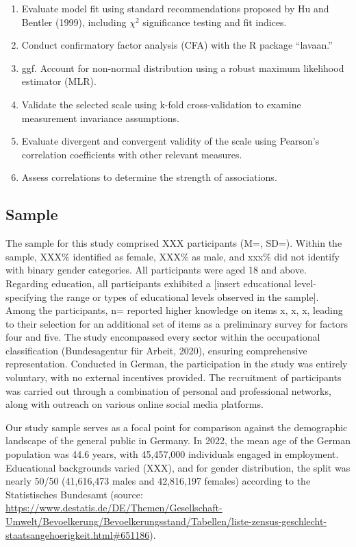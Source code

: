 \documentclass[
  12pt,
  a4paper,
  twoside]{article}
\providecommand{\tightlist}{%
  \setlength{\itemsep}{0pt}\setlength{\parskip}{0pt}}
\begin{document}
\begin{enumerate}
\def\labelenumi{\arabic{enumi}.}
\tightlist
\item
  Evaluate model fit using standard recommendations proposed by Hu and Bentler (1999), including \(\chi^2\) significance testing and fit indices.
\item
  Conduct confirmatory factor analysis (CFA) with the R package ``lavaan.''
\item
  ggf. Account for non-normal distribution using a robust maximum likelihood estimator (MLR).
\item
  Validate the selected scale using k-fold cross-validation to examine measurement invariance assumptions.
\item
  Evaluate divergent and convergent validity of the scale using Pearson's correlation coefficients with other relevant measures.
\item
  Assess correlations to determine the strength of associations.
\end{enumerate}

\hypertarget{sample}{%
\subsection{Sample}\label{sample}}

The sample for this study comprised XXX participants (M=, SD=). Within the sample, XXX\% identified as female, XXX\% as male, and xxx\% did not identify with binary gender categories. All participants were aged 18 and above. Regarding education, all participants exhibited a {[}insert educational level- specifying the range or types of educational levels observed in the sample{]}. Among the participants, n= reported higher knowledge on items x, x, x, leading to their selection for an additional set of items as a preliminary survey for factors four and five.
The study encompassed every sector within the occupational classification (Bundesagentur für Arbeit, 2020), ensuring comprehensive representation. Conducted in German, the participation in the study was entirely voluntary, with no external incentives provided. The recruitment of participants was carried out through a combination of personal and professional networks, along with outreach on various online social media platforms.

Our study sample serves as a focal point for comparison against the demographic landscape of the general public in Germany. In 2022, the mean age of the German population was 44.6 years, with 45,457,000 individuals engaged in employment. Educational backgrounds varied (XXX), and for gender distribution, the split was nearly 50/50 (41,616,473 males and 42,816,197 females) according to the Statistisches Bundesamt (source: \url{https://www.destatis.de/DE/Themen/Gesellschaft-Umwelt/Bevoelkerung/Bevoelkerungsstand/Tabellen/liste-zensus-geschlecht-staatsangehoerigkeit.html\#651186}).
\end{document}
